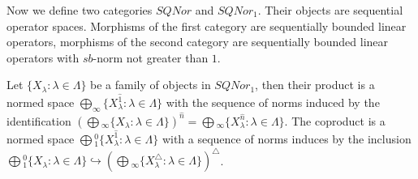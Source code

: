 \documentclass[a0b,landscape]{a0poster}
\begin{document}
\begin{multicols}{4}
Now we define two categories $SQNor$ and $SQNor_1$. Their objects are sequential
operator spaces. Morphisms of the first category are sequentially bounded linear
operators, morphisms of the second category are sequentially bounded linear
operators with $sb$-norm not greater than $1$.

Let $\{X_ \lambda : \lambda \in \Lambda \}$ be a family of objects in $SQNor_1$,
then their product is a normed space $\bigoplus_\infty \{X_ \lambda
^{\widehat{1}}: \lambda \in \Lambda \}$ with the sequence of norms induced by the
identification ${\left(\bigoplus{}_\infty \{X_ \lambda : \lambda  \in
\Lambda \}\right)}^{\widehat{n}} =\bigoplus{}_\infty \{X_ \lambda ^{\widehat{n}}:
\lambda \in \Lambda \}$. The coproduct is a normed space $\bigoplus{}_1^0\{X_
\lambda ^{\widehat{1}}: \lambda \in \Lambda \}$ with a sequence of norms induces
by the inclusion $\bigoplus{}_1^0\{X_ \lambda : \lambda  \in
\Lambda \}\hookrightarrow {\left(\bigoplus{}_\infty \{X_ \lambda ^\triangle:
\lambda \in \Lambda \}\right)}^\triangle$.


\end{multicols}
\end{document}
